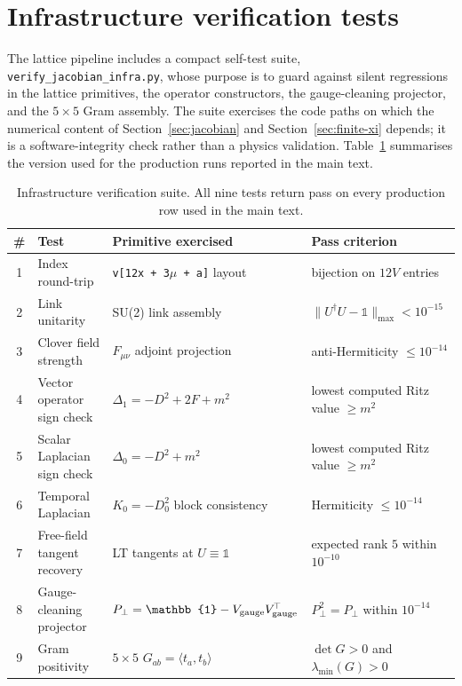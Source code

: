 \documentclass[a4paper,11pt]{article}
\theoremstyle{definition}
\begin{document}
\section{Infrastructure verification tests}
\label{app:infra-tests}

The lattice pipeline includes a compact self-test suite,
\texttt{verify\_jacobian\_infra.py}, whose purpose is to guard against
silent regressions in the lattice primitives, the operator constructors,
the gauge-cleaning projector, and the $5\times 5$ Gram assembly. The
suite exercises the code paths on which the numerical content of
Section~\ref{sec:jacobian} and Section~\ref{sec:finite-xi} depends; it
is a software-integrity check rather than a physics validation.
Table~\ref{tab:app-infra} summarises the version used for the production
runs reported in the main text.

\begin{table}[h]
\centering
\begin{tabular}{clll}
\toprule
\# & Test & Primitive exercised & Pass criterion \\
\midrule
1 & Index round-trip
  & \texttt{v[12x + 3$\mu$ + a]} layout
  & bijection on $12V$ entries \\
2 & Link unitarity
  & SU(2) link assembly
  & $\|U^\dagger U - \mathbb{1}\|_{\max} < 10^{-15}$ \\
3 & Clover field strength
  & $F_{\mu\nu}$ adjoint projection
  & anti-Hermiticity $\leq 10^{-14}$ \\
4 & Vector operator sign check
  & $\Delta_1 = -D^2 + 2F + m^2$
  & lowest computed Ritz value $\geq m^2$ \\
5 & Scalar Laplacian sign check
  & $\Delta_0 = -D^2 + m^2$
  & lowest computed Ritz value $\geq m^2$ \\
6 & Temporal Laplacian
  & $K_0 = -D_0^2$ block consistency
  & Hermiticity $\leq 10^{-14}$ \\
7 & Free-field tangent recovery
  & LT tangents at $U \equiv \mathbb{1}$
  & expected rank $5$ within $10^{-10}$ \\
8 & Gauge-cleaning projector
  & $P_\perp = \mathbb{1} - V_{\rm gauge}V_{\rm gauge}^{\!\top}$
  & $P_\perp^2 = P_\perp$ within $10^{-14}$ \\
9 & Gram positivity
  & $5\times 5$ $G_{ab} = \langle t_a, t_b\rangle$
  & $\det G > 0$ and $\lambda_{\min}(G) > 0$ \\
\bottomrule
\end{tabular}
\caption{Infrastructure verification suite. All nine tests return pass
on every production row used in the main text.}
\label{tab:app-infra}
\end{table}
\end{document}
